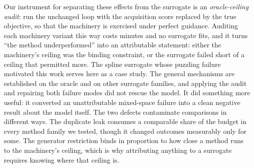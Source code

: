 \documentclass[%
 aip,
 amsmath,amssymb,
 floatfix,
 reprint,%
]{revtex4-1}
\begin{document}
Our instrument for separating these effects from the surrogate is an
\emph{oracle-ceiling audit}: run the unchanged loop with the acquisition
score replaced by the true objective, so that the machinery is exercised
under perfect guidance. Auditing each machinery variant this way costs
minutes and no surrogate fits, and it turns ``the method underperformed''
into an attributable statement: either the machinery's ceiling was the
binding constraint, or the surrogate failed short of a ceiling that
permitted more. The spline surrogate whose puzzling failure motivated this
work serves here as a case study. The general mechanisms are established on
the oracle and on other surrogate families, and applying the audit and
repairing both failure modes did not rescue the model. It did something more
useful: it converted an unattributable mixed-space failure into a clean
negative result about the model itself. The two defects contaminate
comparisons in different ways. The duplicate leak consumes a comparable
share of the budget in every method family we tested, though it changed
outcomes measurably only for some. The generator restriction binds in
proportion to how close a method runs to the machinery's ceiling, which is
why attributing anything to a surrogate requires knowing where that ceiling
is.
\end{document}
